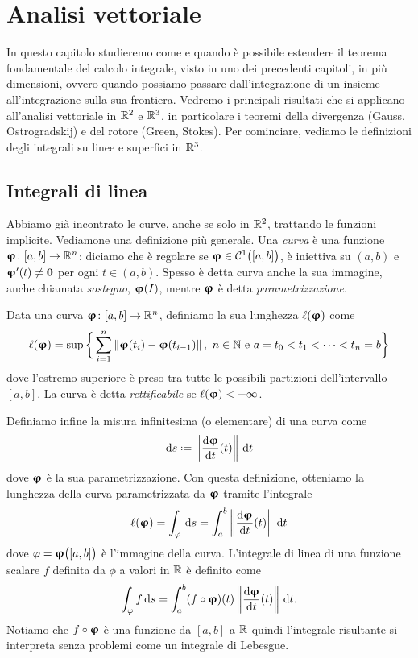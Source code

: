 \chapter{Analisi vettoriale}
In questo capitolo studieremo come e quando è possibile estendere il teorema fondamentale del calcolo integrale, visto in uno dei precedenti capitoli, in più dimensioni, ovvero quando possiamo passare dall'integrazione di un insieme all'integrazione sulla sua frontiera.
Vedremo i principali risultati che si applicano all'analisi vettoriale in $\mathbb{R}^2$ e $\mathbb{R}^3$, in particolare i teoremi della divergenza (Gauss, Ostrogradskij) e del rotore (Green, Stokes).
Per cominciare, vediamo le definizioni degli integrali su linee e superfici in $\mathbb{R}^3$.

\section{Integrali di linea}
Abbiamo già incontrato le curve, anche se solo in $\mathbb{R}^2$, trattando le funzioni implicite.
Vediamone una definizione più generale.
Una \emph{curva} è una funzione $\bm{\upvarphi}\colon [a,b]\to\mathbb{R}^n$: diciamo che è regolare se $\bm{\upvarphi}\in\mathcal{C}^{{1}}\big([a,b]\big)$, è iniettiva su $(a,b)$ e $\bm{\upvarphi}'(t)\ne\mathbf{0}$ per ogni $t\in(a,b)$.
Spesso è detta curva anche la sua immagine, anche chiamata \emph{sostegno}, $\bm{\upvarphi}(I)$, mentre $\bm{\upvarphi}$ è detta \emph{parametrizzazione}.

\begin{definizione} \label{d:lunghezza-curva}
	Data una curva $\bm{\upvarphi}\colon[a,b]\to\mathbb{R}^n$, definiamo la sua lunghezza $\ell(\bm{\upvarphi})$ come
	\begin{equation}
		\ell(\vphi)=\sup\bigg\{\sum_{i=1}^n\norm{\vphi(t_i)-\vphi(t_{i-1})},\ n\in\N\text{ e }a=t_0<t_1<\cdots<t_n=b\bigg\}
		\label{eq:lunghezza-curva}
	\end{equation}
	dove l'estremo superiore è preso tra tutte le possibili partizioni dell'intervallo $[a,b]$.
	La curva è detta \emph{rettificabile} se $\ell(\bm{\upvarphi})<+\infty$.
\end{definizione}

Definiamo infine la misura infinitesima (o elementare) di una curva come
\begin{equation}
	\dd s\defeq\norm{\drv{\vphi}{t}(t)}\,\dd t
	\label{eq:misura-curva}
\end{equation}
dove $\bm{\upvarphi}$ è la sua parametrizzazione.
Con questa definizione, otteniamo la lunghezza della curva parametrizzata da $\bm{\upvarphi}$ tramite l'integrale
\begin{equation}
	\ell(\bm{\upvarphi})=\int_\varphi\,\textup{d} s=\int_a^b\left\|{\frac{\textup{d} {\bm{\upvarphi}}}{\textup{d} {t}}(t)}\right\|\,\textup{d} t
\end{equation}
dove $\varphi=\bm{\upvarphi}\big([a,b]\big)$ è l'immagine della curva.
L'integrale di linea di una funzione scalare $f$ definita da $\phi$ a valori in $\mathbb{R}$ è definito come
\begin{equation}
	\int_\varphi f\,\textup{d} s=\int_a^b(f\circ\bm{\upvarphi})(t)\left\|{\frac{\textup{d} {\bm{\upvarphi}}}{\textup{d} {t}}(t)}\right\|\,\textup{d} t.
\end{equation}
Notiamo che $f\circ\bm{\upvarphi}$ è una funzione da $[a,b]$ a $\mathbb{R}$ quindi l'integrale risultante si interpreta senza problemi come un integrale di Lebesgue.


